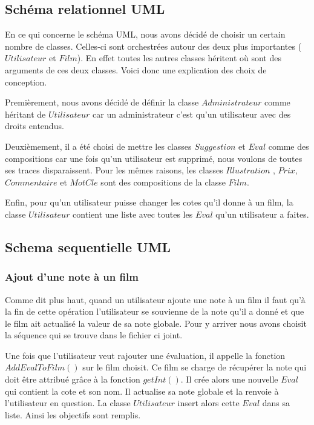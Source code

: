 \documentclass[10pt,a4paper]{article}
\begin{document}
\subsection{Schéma relationnel UML}

    En ce qui concerne le schéma UML, nous avons décidé de choisir un certain nombre de classes. Celles-ci sont orchestrées autour des deux plus importantes ($Utilisateur$ et $Film$). En effet toutes les autres classes héritent où sont des arguments de ces deux classes. Voici donc une explication des choix de conception.

    

    

    Premièrement, nous avons décidé de définir la classe $Administrateur$ comme héritant de $Utilisateur$ car un administrateur c'est qu'un utilisateur avec des droits entendus.

    

    Deuxièmement, il a été choisi de mettre les classes $Suggestion$ et $Eval$ comme des compositions car une fois qu'un utilisateur est supprimé, nous voulons de toutes ses traces disparaissent. Pour les mêmes raisons, les classes $Illustration$ , $Prix$, $Commentaire$ et $MotCle$ sont des compositions de la classe $Film$.

    

    Enfin, pour qu'un utilisateur puisse changer les cotes qu'il donne à un film, la classe $Utilisateur$ contient une liste avec toutes les $Eval$ qu'un utilisateur a faites.

    

        

\subsection{Schema sequentielle UML}

    \subsubsection{Ajout d'une note à un film}

    Comme dit plus haut, quand un utilisateur ajoute une note à un film il faut qu'à la fin de cette opération l'utilisateur se souvienne de la note qu'il a donné et que le film ait actualisé la valeur de sa note globale. Pour y arriver nous avons choisit la séquence qui se trouve dans le fichier ci joint.

    

    Une fois que l'utilisateur veut rajouter une évaluation, il appelle la fonction $AddEvalToFilm()$ sur le film choisit. Ce film se charge de récupérer la note qui doit être attribué grâce à la fonction $getInt()$. Il crée alors une nouvelle $Eval$ qui contient la cote et son nom. Il actualise sa note globale et la renvoie à l'utilisateur en question. La classe $Utilisateur$ insert alors cette $Eval$ dans sa liste. Ainsi les objectifs sont remplis.
\end{document}
